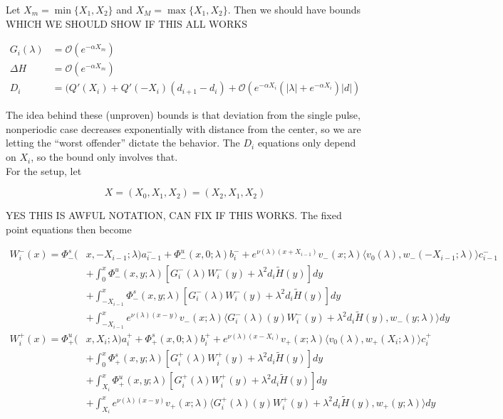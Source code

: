\documentclass[12pt]{article}
\begin{document}
Let $X_m = \min\{ X_1, X_2 \}$ and $X_M = \max\{ X_1, X_2 \}$. Then we should have bounds WHICH WE SHOULD SHOW IF THIS ALL WORKS

\begin{align*}
G_i(\lambda) &= \mathcal{O}(e^{-\alpha X_m}) \\
\Delta H &= \mathcal{O}(e^{-\alpha X_m}) \\
D_i &= ( Q'(X_i) + Q'(-X_i)(d_{i+1} - d_i ) + \mathcal{O} \left( e^{-\alpha X_i} \left( |\lambda| +  e^{-\alpha X_i}  \right) |d| \right)
\end{align*}

The idea behind these (unproven) bounds is that deviation from the single pulse, nonperiodic case decreases exponentially with distance from the center, so we are letting the ``worst offender'' dictate the behavior. The $D_i$ equations only depend on $X_i$, so the bound only involves that. \\

For the setup, let

\[
X = (X_0, X_1, X_2) = (X_2, X_1, X_2)
\]

YES THIS IS AWFUL NOTATION, CAN FIX IF THIS WORKS. The fixed point equations then become

\begin{align*}
W_i^-(x) = \Phi^s_-(&x, -X_{i-1}; \lambda)a_{i-1}^- + \Phi^u_-(x, 0; \lambda)b_i^- + e^{\nu(\lambda)(x+X_{i-1})} v_-(x; \lambda) \langle v_0(\lambda), w_-(-X_{i-1}; \lambda) \rangle c_{i-1}^- \\
&+ \int_0^x \Phi^u_-(x, y; \lambda)[ G_i^-(\lambda)W_i^-(y) + \lambda^2 d_i \tilde{H}(y) ] dy \\
&+ \int_{-X_{i-1}}^x \Phi^s_-(x, y; \lambda) [ G_i^-(\lambda)W_i^-(y) + \lambda^2 d_i \tilde{H}(y) ] dy \\
&+ \int_{-X_{i-1}}^x 
e^{\nu(\lambda)(x-y)} v_-(x; \lambda) \langle G_i^-(\lambda)(y)W_i^-(y) + \lambda^2 d_i \tilde{H}(y), w_-(y; \lambda) \rangle dy \\
W_i^+(x) = \Phi^u_+(&x, X_i; \lambda)a_i^+ + \Phi^s_+(x, 0; \lambda)b_i^+ + e^{\nu(\lambda)(x - X_i)} v_+(x; \lambda) \langle v_0(\lambda), w_+(X_i; \lambda) \rangle c_i^+ \\
&+ \int_0^x \Phi^s_+(x, y; \lambda) [ G_i^+(\lambda)W_i^+(y) + \lambda^2 d_i \tilde{H}(y) ] dy \\
&+ \int_{X_i}^x \Phi^u_+(x, y; \lambda) [ G_i^+(\lambda)W_i^+(y) + \lambda^2 d_i \tilde{H}(y) ] dy \\
&+ \int_{X_i}^x e^{\nu(\lambda)(x-y)} v_+(x; \lambda) \langle G_i^+(\lambda)(y)W_i^+(y) + \lambda^2 d_i \tilde{H}(y), w_+(y; \lambda) \rangle dy
\end{align*}
\end{document}

